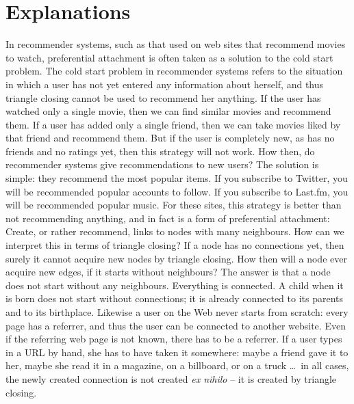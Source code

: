 \documentclass{jimis}
\begin{document}
\section{Explanations}
In recommender systems, such as that used on web sites that recommend movies to
watch, preferential attachment is often taken as a solution to the cold
start problem.  The cold start problem in recommender systems refers to
the situation in which a user has not yet entered any information about
herself, and thus triangle closing cannot be used to recommend her
anything.  If the user has watched only a single movie, then we can find
similar movies and recommend them.  If a user has added only a single
friend, then we can take movies liked by that friend and recommend them.
But if the user is completely new, as has no friends and no ratings yet,
then this strategy will not work.  How then, do recommender systems give
recommendations to new users?  The solution is simple: they recommend
the most popular items.  If you subscribe to Twitter, you will be
recommended popular accounts to follow.  If you subscribe to Last.fm,
you will be recommended popular music.  For these sites, this strategy
is better than not recommending anything, and in fact is a form of
preferential attachment: Create, or rather recommend, links to nodes
with many neighbours.  How can we interpret this in terms of triangle
closing?  If a node has no connections yet, then surely it cannot
acquire new nodes by triangle closing.  How then will a node ever
acquire new edges, if it starts without neighbours?  The answer is that
a node does not start without any neighbours.  Everything is connected.
A child when it is born does not start without connections; it is
already connected to its parents and to its birthplace.  Likewise a
user on the Web never starts from scratch: every page has a referrer,
and thus the user can be connected to another website.  Even if the
referring web page is not known, there has to be a referrer.  If a user
types in a URL by hand, she has to have taken it somewhere: maybe a
friend gave it to her, maybe she read it
in a magazine, on a billboard, or on a truck \ldots\ in all cases, the
newly created connection is not created \emph{ex nihilo} -- it is created
by triangle closing.
\end{document}
